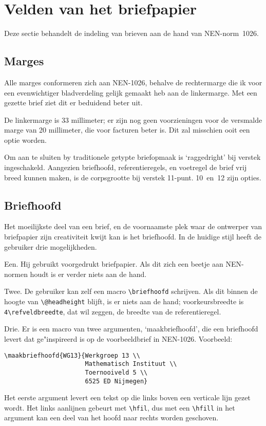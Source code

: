 \documentclass[a4paper,10pt]{artikel1}
\begin{document}
\section{Velden van het briefpapier}
 
Deze sectie behandelt de indeling van brieven aan de hand van
NEN-norm~1026.
 
\subsection{Marges}
 
Alle marges conformeren zich aan NEN-1026, behalve de rechtermarge die
ik voor een evenwichtiger bladverdeling gelijk gemaakt heb aan de
linkermarge.  Met een gezette brief ziet dit er beduidend beter uit.
 
De linkermarge is 33 millimeter; er zijn nog geen voorzieningen voor
de versmalde marge van 20 millimeter, die voor facturen beter is.  Dit
zal misschien ooit een optie worden.
 
Om aan te sluiten by traditionele getypte briefopmaak is `raggedright'
bij verstek ingeschakeld.  Aangezien briefhoofd, referentieregels, en
voetregel de brief vrij breed kunnen maken, is de corpsgrootte bij
verstek 11-punt.  10~en~12 zijn opties.
 
\subsection{Briefhoofd}
 
Het moeilijkste deel van een brief, en de voornaamste plek waar de
ontwerper van briefpapier zijn creativiteit kwijt kan is het
briefhoofd.  In de huidige stijl heeft de gebruiker drie
mogelijkheden.
 
Een. Hij gebruikt voorgedrukt briefpapier. Als dit zich een beetje aan
NEN-normen houdt is er verder niets aan de hand.
 
Twee. De gebruiker kan zelf een macro \verb.\briefhoofd. schrijven.
Als dit binnen de hoogte van \verb.\@headheight. blijft, is er niets
aan de hand; voorkeursbreedte is \verb.4\refveldbreedte., dat wil
zeggen, de breedte van de referentieregel.
 
Drie. Er is een macro van twee argumenten, `maakbriefhoofd', die een
briefhoofd levert dat ge"inspireerd is op de voorbeeldbrief in
NEN-1026. Voorbeeld:
\begin{verbatim}
\maakbriefhoofd{WG13}{Werkgroep 13 \\
                      Mathematisch Instituut \\
                      Toernooiveld 5 \\
                      6525 ED Nijmegen}
\end{verbatim}
Het eerste argument levert een tekst op die links boven een verticale
lijn gezet wordt.  Het links aanlijnen gebeurt met \verb.\hfil., dus
met een \verb.\hfill. in het argument kan een deel van het hoofd naar
rechts worden geschoven.
 
\end{document}
